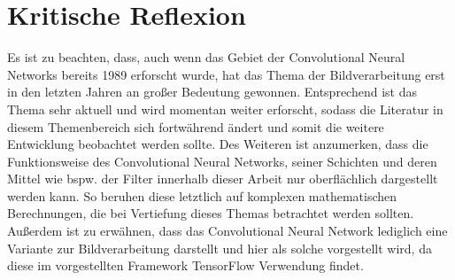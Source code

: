 \section{Kritische Reflexion}
\label{sec:Kritik}
Es ist zu beachten, dass, auch wenn das Gebiet der Convolutional Neural Networks bereits 1989 erforscht wurde, hat das Thema der Bildverarbeitung erst in den letzten Jahren an großer Bedeutung gewonnen. Entsprechend ist das Thema sehr aktuell und wird momentan weiter erforscht, sodass die Literatur in diesem Themenbereich sich fortwährend ändert und somit die weitere Entwicklung beobachtet werden sollte. Des Weiteren ist anzumerken, dass die Funktionsweise des Convolutional Neural Networks, seiner Schichten und deren Mittel wie bspw. der Filter innerhalb dieser Arbeit nur oberflächlich dargestellt werden kann. So beruhen diese letztlich auf komplexen mathematischen Berechnungen, die bei Vertiefung dieses Themas betrachtet werden sollten. Außerdem ist zu erwähnen, dass das Convolutional Neural Network lediglich eine Variante zur Bildverarbeitung darstellt und hier als solche vorgestellt wird, da diese im vorgestellten Framework TensorFlow Verwendung findet.